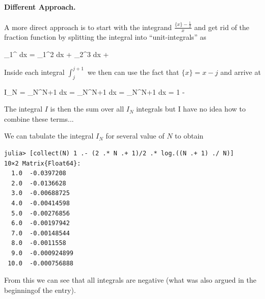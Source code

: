 \paragraph{Different Approach.} A more direct approach is to start with the integrand $\frac{\{x\} - \frac{1}{2}}{x}$ and get rid of the fraction function by splitting the integral into ``unit-integrals'' as

\bee
\int_1^\infty {} dx = \int_1^2  dx + \int_2^3  dx + \cdots
\eee

Inside each integral $\int_j^{j+1}$ we then can use the fact that $\{ x \} = x-j$ and arrive at

\bee
I_N = \int_N^{N+1}  dx = \int_N^{N+1}  dx = \int_N^{N+1}  dx = 1 -  \log {}
\eee

The integral $I$ is then the sum over all $I_N$ integrals but I have no idea how to combine these terms...

We can tabulate the integral $I_N$ for several value of $N$ to obtain

\begin{verbatim}
julia> [collect(N) 1 .- (2 .* N .+ 1)/2 .* log.((N .+ 1) ./ N)]
10×2 Matrix{Float64}:
  1.0  -0.0397208
  2.0  -0.0136628
  3.0  -0.00688725
  4.0  -0.00414598
  5.0  -0.00276856
  6.0  -0.00197942
  7.0  -0.00148544
  8.0  -0.0011558
  9.0  -0.000924899
 10.0  -0.000756888
\end{verbatim}

From this we can see that all integrals are negative (what was also argued in the beginningof the entry). 


